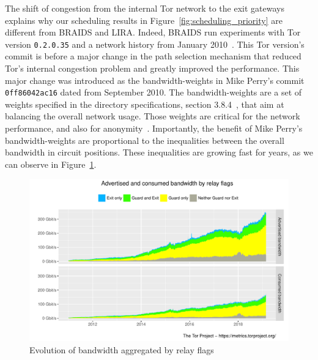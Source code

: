 The shift of congestion from the internal Tor network to the exit gateways explains why our scheduling results in Figure~\ref{fig:scheduling_priority} are different from BRAIDS
and LIRA. Indeed, BRAIDS run experiments with Tor version \texttt{0.2.0.35} and a network history
from January 2010~\cite{braids-repository}. This Tor version's commit is
before a major change in the path selection mechanism that reduced Tor's
internal congestion problem and greatly improved the performance. This major change
was introduced as the bandwidth-weights in Mike Perry's commit \texttt{0ff86042ac16}
dated from September 2010. The bandwidth-weights are a set of weights specified
in the directory specifications, section 3.8.4~\cite{dirspec}, that aim at
balancing the overall network usage. Those weights are
critical for the network performance, and also for
anonymity~\cite{waterfilling-pets2017, wf_proposal}. Importantly, the benefit
of Mike Perry's bandwidth-weights are proportional to the inequalities between
the overall bandwidth in circuit positions. These inequalities are growing fast for years, as we can observe in Figure~\ref{fig:bw_inequalities}.

\begin{figure}
  \includegraphics[scale=0.415]{images/bandwidth-flags-2011-01-01-2019-02-25.pdf}
  \caption{Evolution of bandwidth aggregated by relay flags} \label{fig:bw_inequalities}
\end{figure}

